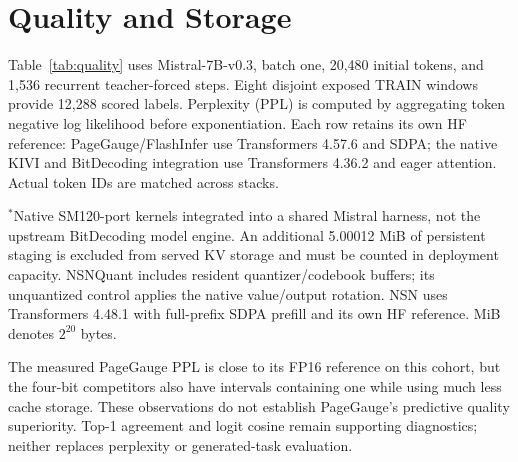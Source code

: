 \documentclass{article}
\begin{document}
\section{Quality and Storage}
Table~\ref{tab:quality} uses Mistral-7B-v0.3, batch one, 20,480 initial tokens,
and 1,536 recurrent teacher-forced steps. Eight disjoint exposed TRAIN windows
provide 12,288 scored labels. Perplexity (PPL) is computed by aggregating token
negative log likelihood before exponentiation. Each row retains its own HF
reference: PageGauge/FlashInfer use Transformers 4.57.6 and SDPA; the native
KIVI and BitDecoding integration use Transformers 4.36.2 and eager attention.
Actual token IDs are matched across stacks.

\begin{table}[t]
\caption{Development quality and served KV storage. PPL ratios compare each
implementation with its own HF reference. Intervals are descriptive paired-window
bootstrap intervals, not independent-book or prospective non-inferiority tests.
Cache storage includes metadata and exact residual regions but excludes model
weights, activations, allocator reserve, and separate staging.}
\label{tab:quality}
\centering\small

\par\smallskip\footnotesize
$^*$Native SM120-port kernels integrated into a shared Mistral harness,
not the upstream BitDecoding model engine. An additional 5.00012 MiB of
persistent staging is excluded from served KV storage and must be counted in
deployment capacity. NSNQuant includes resident quantizer/codebook buffers;
its unquantized control applies the native value/output rotation. NSN uses
Transformers 4.48.1 with full-prefix SDPA prefill and its own HF reference.
MiB denotes $2^{20}$ bytes.
\end{table}

\begin{table}[t]
\caption{Instrumented GPU self-time in ms per decode step, batch one, final
129 steps of the same 1,536-step development trajectory. The FP16 attention
column is the full cache for FlashInfer but only exact regions for PageGauge.
The total also includes operations not separately shown.}
\label{tab:profile}\centering\small

\end{table}

The measured PageGauge PPL is close to its FP16 reference on this cohort, but
the four-bit competitors also have intervals containing one while using much
less cache storage. These observations do not establish PageGauge's predictive
quality superiority. Top-1 agreement and logit cosine remain supporting
diagnostics; neither replaces perplexity or generated-task evaluation.
\end{document}
